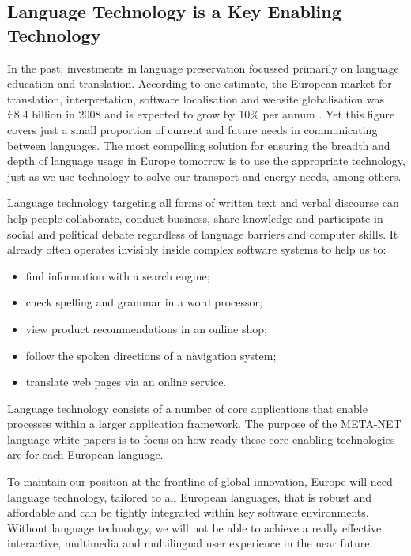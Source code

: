\begin{multicols}{2}
\subsection{Language Technology is a Key Enabling Technology}

In the past, investments in language preservation focussed primarily on language education and translation. According to one estimate, the European market for translation, interpretation, software localisation and website globalisation was €8.4 billion in 2008 and is expected to grow by 10\% per annum \cite{EC3}. Yet this figure covers just a small proportion of current and future needs in communicating between languages. The most compelling solution for ensuring the breadth and depth of language usage in Europe tomorrow is to use the appropriate technology, just as we use technology to solve our transport and energy needs, among others.


Language technology targeting all forms of written text and verbal discourse can help people collaborate, conduct business, share knowledge and participate in social and political debate regardless of language barriers and computer skills. It already often operates invisibly inside complex software systems to help us to:

\begin{itemize}
\item find information with a search engine;
\item check spelling and grammar in a word processor;
\item view product recommendations in an online shop;
\item follow the spoken directions of a navigation system;
\item translate web pages via an online service.
\end{itemize}

Language technology consists of a number of core applications that enable processes within a larger application framework. The purpose of the META-NET language white papers is to focus on how ready these core enabling technologies are for each European language. 

To maintain our position at the frontline of global innovation, Europe will need language technology, tailored to all European languages, that is robust and affordable and can be tightly integrated within key software environments. Without language technology, we will not be able to achieve a really effective interactive, multimedia and multilingual user experience in the near future.


\end{multicols}
